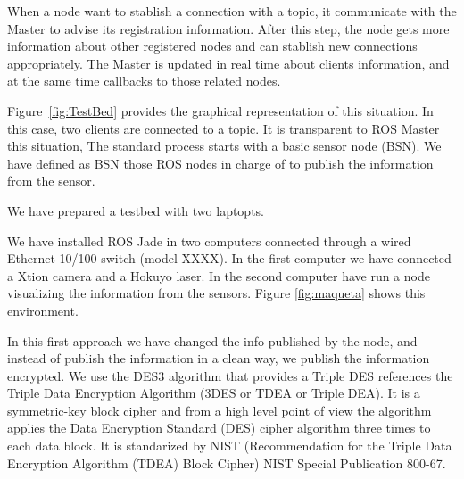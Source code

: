 \documentclass[journal,twoside]{JoPhA}
\begin{document}
When a node want to stablish a connection with a topic, it communicate with the Master to advise its registration information. After this step, the node gets more information about other registered nodes and can stablish new connections appropriately. The Master is updated in real time about clients information, and at the same time callbacks to those related nodes.




Figure~\ref{fig:TestBed} provides the graphical representation of this situation. In this case, two clients are connected to a topic. It is transparent to ROS Master this situation,  
The standard process starts with a basic sensor node (BSN). We have defined as BSN those ROS nodes in charge of to publish the information from the sensor.



We have prepared a  testbed with two laptopts.


We have installed ROS Jade in two computers connected through a wired Ethernet 10/100 switch (model XXXX). In the first computer we have connected a Xtion camera and a Hokuyo laser. In the second computer have run a node visualizing the information from the sensors. Figure \ref{fig:maqueta} shows this environment.



In this first approach we have changed the info published by the node, and instead of publish the information in a clean way, we publish the information encrypted.
We use the DES3 algorithm that provides a 
Triple DES references the Triple Data Encryption Algorithm (3DES or TDEA or Triple DEA). It is a symmetric-key block cipher and from a high level point of view the algorithm applies the Data Encryption Standard (DES) cipher algorithm three times to each data block. It is standarized by NIST (Recommendation for
the Triple Data Encryption Algorithm (TDEA) Block Cipher) NIST Special Publication 800-67.
\end{document}
